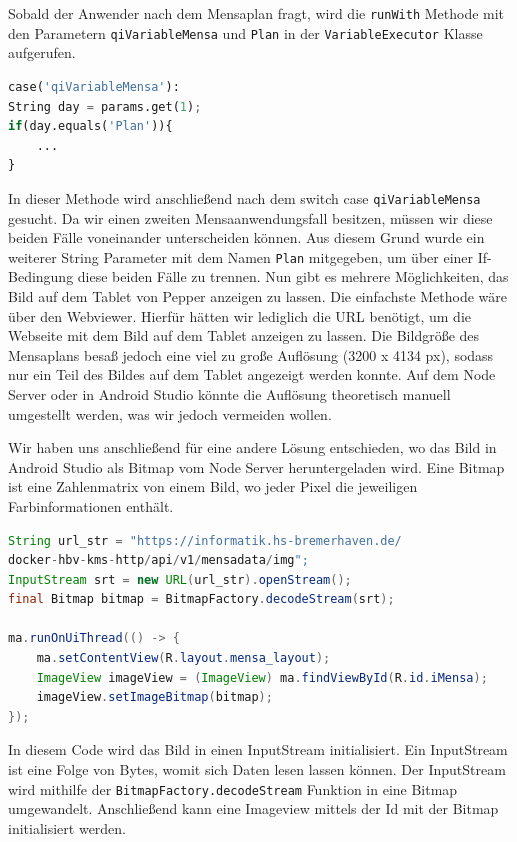 Sobald der Anwender nach dem Mensaplan fragt, wird die \verb|runWith| Methode mit den Parametern \verb|qiVariableMensa|
und \verb|Plan| in der \verb|VariableExecutor| Klasse aufgerufen.\\

\begin{lstlisting}[language=Python]
case('qiVariableMensa'):
String day = params.get(1);
if(day.equals('Plan')){
    ...
}
\end{lstlisting}

In dieser Methode wird anschließend nach dem switch 
case \verb|qiVariableMensa| gesucht. Da wir einen zweiten Mensaanwendungsfall besitzen, müssen wir diese beiden Fälle  voneinander unterscheiden können. Aus diesem Grund wurde ein weiterer String Parameter mit dem Namen \verb|Plan| mitgegeben,  um über einer If-Bedingung diese beiden Fälle zu trennen. Nun gibt es mehrere Möglichkeiten, das Bild auf dem Tablet von Pepper anzeigen zu lassen. Die einfachste Methode wäre über den Webviewer. Hierfür hätten wir lediglich die URL benötigt, um die Webseite mit dem Bild auf dem  Tablet anzeigen zu lassen. Die Bildgröße des Mensaplans besaß jedoch eine viel zu große Auflösung (3200 x 4134 px), sodass nur ein Teil des Bildes auf dem Tablet angezeigt werden konnte. Auf dem Node Server oder in Android Studio könnte die Auflösung theoretisch manuell umgestellt werden, was wir jedoch vermeiden wollen. 

Wir haben uns anschließend für eine andere Lösung entschieden, wo das Bild in Android Studio als Bitmap vom Node Server heruntergeladen wird. Eine Bitmap ist eine Zahlenmatrix von einem Bild, wo jeder Pixel die jeweiligen Farbinformationen enthält.\\


\begin{lstlisting}[language=Java]
String url_str = "https://informatik.hs-bremerhaven.de/
docker-hbv-kms-http/api/v1/mensadata/img";
InputStream srt = new URL(url_str).openStream();
final Bitmap bitmap = BitmapFactory.decodeStream(srt);
    
ma.runOnUiThread(() -> {
    ma.setContentView(R.layout.mensa_layout);
    ImageView imageView = (ImageView) ma.findViewById(R.id.iMensa);
    imageView.setImageBitmap(bitmap);
});
\end{lstlisting}

In diesem Code wird das Bild in einen InputStream initialisiert. Ein InputStream ist eine Folge von Bytes, womit sich Daten lesen 
lassen können. Der InputStream wird mithilfe der \verb|BitmapFactory.decodeStream| Funktion in eine Bitmap umgewandelt. 
Anschließend kann eine Imageview mittels der Id mit der Bitmap initialisiert werden. 

